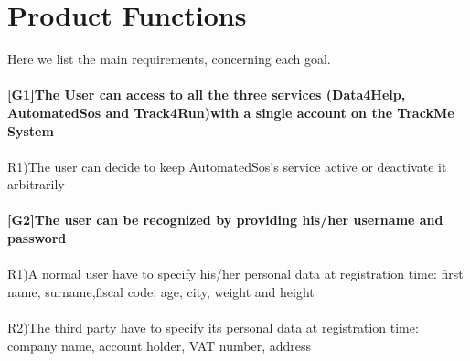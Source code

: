 \section{Product Functions}

Here we list the main requirements, concerning each goal. \\ \\
\textbf{[G1]The User can access to all the three services (Data4Help, AutomatedSos and Track4Run)with a single account on the TrackMe System} \\ \\
R1)The user can decide to keep AutomatedSos's service active or deactivate it arbitrarily \\ \\
\textbf{[G2]The user can be recognized by providing his/her username and password} \\ \\
R1)A normal user  have to specify his/her personal data at registration time: first name, surname,fiscal code, age, city, weight and height \\ \\
R2)The third party have to specify its personal data at registration time: company name, account holder, VAT number, address \newline \newline



